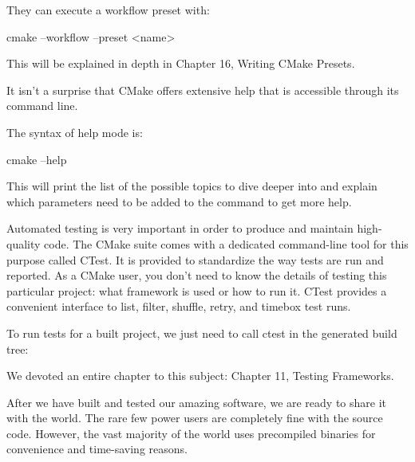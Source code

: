 They can execute a workflow preset with:

\begin{shell}
cmake --workflow --preset <name>
\end{shell}

This will be explained in depth in Chapter 16, Writing CMake Presets.


It isn’t a surprise that CMake offers extensive help that is accessible through its command line.

The syntax of help mode is:

\begin{shell}
cmake --help
\end{shell}

This will print the list of the possible topics to dive deeper into and explain which parameters need to be added to the command to get more help.


Automated testing is very important in order to produce and maintain high-quality code. The CMake suite comes with a dedicated command-line tool for this purpose called CTest. It is provided to standardize the way tests are run and reported. As a CMake user, you don’t need to know the details of testing this particular project: what framework is used or how to run it. CTest provides a convenient interface to list, filter, shuffle, retry, and timebox test runs.

To run tests for a built project, we just need to call ctest in the generated build tree:


We devoted an entire chapter to this subject: Chapter 11, Testing Frameworks.


After we have built and tested our amazing software, we are ready to share it with the world. The rare few power users are completely fine with the source code. However, the vast majority of the world uses precompiled binaries for convenience and time-saving reasons.

